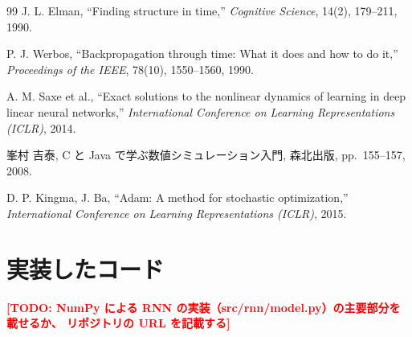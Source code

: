 \documentclass[a4paper,11pt,openany]{ltjsreport}
\newcommand{\TODO}[1]{\textcolor{red}{\textbf{[TODO: #1]}}}
\begin{document}
\begin{thebibliography}{99}
J. L. Elman,
``Finding structure in time,''
\textit{Cognitive Science}, 14(2), 179--211, 1990.

P. J. Werbos,
``Backpropagation through time: What it does and how to do it,''
\textit{Proceedings of the IEEE}, 78(10), 1550--1560, 1990.

A. M. Saxe et al.,
``Exact solutions to the nonlinear dynamics of learning in deep linear neural networks,''
\textit{International Conference on Learning Representations (ICLR)}, 2014.

峯村 吉泰,
C と Java で学ぶ数値シミュレーション入門,
森北出版, pp.~155--157, 2008.

D. P. Kingma, J. Ba,
``Adam: A method for stochastic optimization,''
\textit{International Conference on Learning Representations (ICLR)}, 2015.


\end{thebibliography}

\appendix
\chapter{実装したコード}
\label{app:code}

\TODO{NumPy による RNN の実装（src/rnn/model.py）の主要部分を載せるか、
      リポジトリの URL を記載する}
\end{document}
